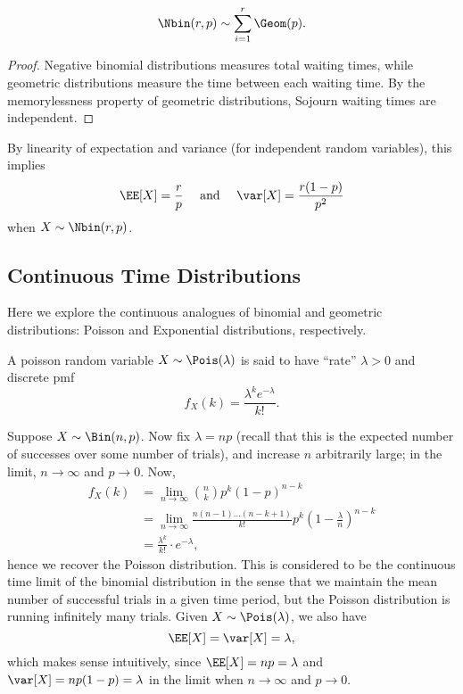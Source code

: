 \begin{theorem}
\lemlabel

\[\Nbin(r,p) \sim \sum_{i=1}^r \Geom(p).\]
\end{theorem}

\begin{proof}
Negative binomial distributions measures total waiting times, while geometric distributions measure the time between each waiting time. By the memorylessness property of geometric distributions, Sojourn waiting times are independent.
\end{proof}

By linearity of expectation and variance (for independent random variables), this implies
\[\EE[X] = \frac{r}{p} \quad \text{ and }\quad \var[X] = \frac{r(1-p)}{p^2}\]
when $X\sim \Nbin(r,p)$.

\subsection{Continuous Time Distributions}

Here we explore the continuous analogues of binomial and geometric distributions: Poisson and Exponential distributions, respectively. 

\begin{definition}

A \ac{poisson} random variable $X\sim \Pois(\lambda)$ is said to have ``rate'' $\lambda > 0$ and discrete pmf 
\[f_X(k) = \frac{\lambda^k e^{-\lambda}}{k!}.\]
\end{definition}

Suppose $X\sim \Bin(n,p)$. Now fix $\lambda = np$ (recall that this is the expected number of successes over some number of trials), and increase $n$ arbitrarily large; in the limit, $n\rightarrow \infty$ and $p\rightarrow 0$. Now, 
\begin{align*}
    f_X(k) &= \lim_{n\rightarrow \infty}\binom{n}{k}p^k(1-p)^{n-k} \\
    &= \lim_{n\rightarrow \infty}\frac{n(n-1)\hdots (n-k+1)}{k!}p^k\left(1-\frac{\lambda}{n}\right)^{n-k} \\
    &= \frac{\lambda^k}{k!}\cdot e^{-\lambda},
\end{align*}
hence we recover the Poisson distribution. This is considered to be the continuous time limit of the binomial distribution in the sense that we maintain the mean number of successful trials in a given time period, but the Poisson distribution is running infinitely many trials. Given $X\sim \Pois(\lambda)$, we also have 
\[\EE[X] = \var[X] = \lambda,\]
which makes sense intuitively, since $\EE[X] = np = \lambda$ and $\var[X] = np(1-p) = \lambda$ in the limit when $n\rightarrow \infty$ and $p\rightarrow 0$. 

